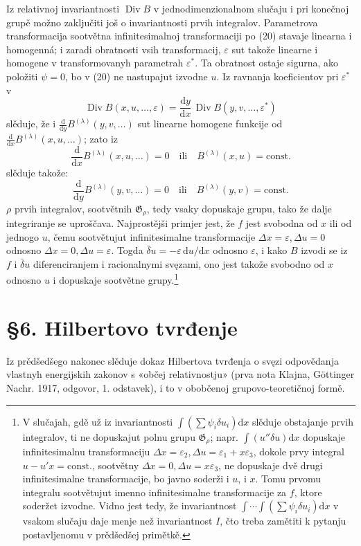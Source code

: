 \documentclass[11pt]{article}
\providecommand{\G}{\mathfrak G}
\providecommand{\eps}{\varepsilon}
\providecommand{\D}{\Delta}
\providecommand{\dd}{\mathrm d}
\DeclareMathOperator{\Div}{Div}
\providecommand{\bd}{\bar{\delta}}
\begin{document}
Iz relativnoj invariantnosti \(\Div B\) v jednodimenzionalnom slučaju i pri konečnoj grupě možno zaključiti još o invariantnosti prvih integralov. Parametrova transformacija sootvětna infinitesimalnoj transformaciji po (20) stavaje linearna i homogenná; i zaradi obratnosti vsih transformacij, \(\eps\) sut takože linearne i homogene v transformovanyh parametrah \(\eps^*\). Ta obratnost ostaje sigurna, ako položiti \(\psi=0\), bo v (20) ne nastupajut izvodne \(u\). Iz ravnanja koeficientov pri \(\eps^*\) v
\[
\Div B(x,u,\ldots,\eps)=\frac{\dd y}{\dd x}\,\Div B(y,v,\ldots,\eps^*)
\]
slěduje, že i \(\frac{\dd}{\dd y}B^{(\lambda)}(y,v,\ldots)\) sut linearne homogene funkcije od \(\frac{\dd}{\dd x}B^{(\lambda)}(x,u,\ldots)\); zato iz
\[
\frac{\dd}{\dd x}B^{(\lambda)}(x,u,\ldots)=0
\quad\text{ili}\quad B^{(\lambda)}(x,u)=\mathrm{const.}
\]
slěduje takože:
\[
\frac{\dd}{\dd y}B^{(\lambda)}(y,v,\ldots)=0
\quad\text{ili}\quad B^{(\lambda)}(y,v)=\mathrm{const.}
\]
\(\rho\) prvih integralov, sootvětnih \(\G_\rho\), tedy vsaky dopuskaje grupu, tako že dalje integriranje se uproščava. Najprostějši primjer jest, že \(f\) jest svobodna od \(x\) ili od jednogo \(u\), čemu sootvětujut infinitesimalne transformacije \(\D x=\eps,\D u=0\) odnosno \(\D x=0,\D u=\eps\). Togda \(\bd u=-\eps\,\dd u/\dd x\) odnosno \(\eps\), i kako \(B\) izvodi se iz \(f\) i \(\bd u\) diferenciranjem i racionalnymi svęzami, ono jest takože svobodno od \(x\) odnosno \(u\) i dopuskaje sootvětne grupy.\footnote{V slučajah, gdě už iz invariantnosti \(\int(\sum\psi_i\delta u_i)\dd x\) slěduje obstajanje prvih integralov, ti ne dopuskajut polnu grupu \(\G_\rho\); napr. \(\int(u''\delta u)\dd x\) dopuskaje infinitesimalnu transformaciju \(\D x=\eps_2,\D u=\eps_1+x\eps_3\), dokole prvy integral \(u-u'x=\mathrm{const.}\), sootvětny \(\D x=0,\D u=x\eps_3\), ne dopuskaje dvě drugi infinitesimalne transformacije, bo javno soderži i \(u\), i \(x\). Tomu prvomu integralu sootvětujut imenno infinitesimalne transformacije za \(f\), ktore soderžet izvodne. Vidno jest tedy, že invariantnost \(\int\!\cdots\!\int(\sum\psi_i\delta u_i)\dd x\) v vsakom slučaju daje menje než invariantnost \(I\), čto treba zamětiti k pytanju postavljenomu v prědšedšej primětkě.}

\section*{\S{}6. Hilbertovo tvrđenje}

Iz prědšedšego nakonec slěduje dokaz Hilbertova tvrđenja o svęzi odpovědanja vlastnyh energijskih zakonov s «občej relativnostju» (prva nota Klajna, Göttinger Nachr. 1917, odgovor, 1. odstavek), i to v obobčenoj grupovo-teoretičnoj formě.
\end{document}
